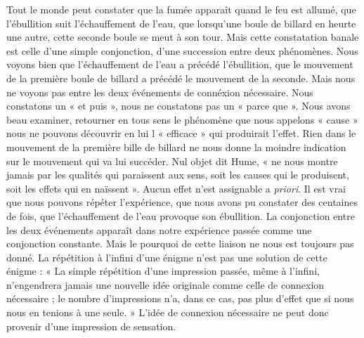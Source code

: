 Tout le monde peut constater que la fumée apparaît
quand le feu est allumé, que l’ébullition suit l’échauffement
de l’eau, que lorsqu'une boule de billard en heurte une
autre, cette seconde boule se meut à son tour. Mais cette
constatation banale est celle d’une simple conjonction,
d’une succession entre deux phénomènes. Nous voyons
bien que l’échauffement de l’eau a précédé l’ébullition,
que le mouvement de la première boule de billard a précédé
le mouvement de la seconde. Mais nous ne voyons pas
entre les deux événements de connéxion nécessaire. Nous
constatons un « et puis », nous ne constatons pas un
« parce que ». Nous avons beau examiner, retourner en
tous sens le phénomène que nous appelons « cause » nous
ne pouvons découvrir en lui l « efficace » qui produirait
l'effet. Rien dans le mouvement de la première bille de
billard ne nous donne la moindre indication sur le mouvement qui va lui succéder. Nul objet dit Hume, « ne nous
montre jamais par les qualités qui paraissent aux sens,
soit les causes qui le produisent, soit les effets qui en
naïssent ». Aucun effet n’est assignable a {\it priori}. Il est
vrai que nous pouvons répéter l'expérience, que nous
avons pu constater des centaines de fois, que l’échauffement de l’eau provoque son ébullition. La conjonction
entre les deux événements apparaît dans notre expérience
passée comme une conjonction constante. Mais le pourquoi
de cette liaison ne nous est toujours pas donné. La répétition
à l'infini d’une énigme n’est pas une solution de cette
énigme : « La simple répétition d’une impression passée,
même à l'infini, n’engendrera jamais une nouvelle idée
originale comme celle de connexion nécessaire ; le nombre
d’impressions n’a, dans ce cas, pas plus d'effet que si nous
nous en tenions à une seule. » L'idée de connexion nécessaire ne peut donc provenir d’une impression de sensation.

